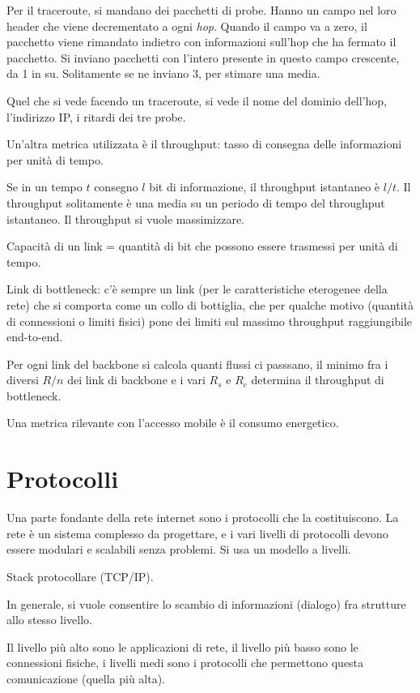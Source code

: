 Per il traceroute, si mandano dei pacchetti di probe. Hanno un campo nel loro header che viene decrementato a ogni \emph{hop}. Quando il campo va a zero, il pacchetto viene rimandato indietro con informazioni sull'hop che ha fermato il pacchetto. Si inviano pacchetti con l'intero presente in questo campo crescente, da 1 in su. Solitamente se ne inviano 3, per stimare una media.

Quel che si vede facendo un traceroute, si vede il nome del dominio dell'hop, l'indirizzo IP, i ritardi dei tre probe.

Un'altra metrica utilizzata \`e il throughput: tasso di consegna delle informazioni per unit\`a di tempo.

Se in un tempo $t$ consegno $l$ bit di informazione, il throughput istantaneo \`e $l/t$. Il throughput solitamente \`e una media su un periodo di tempo del throughput istantaneo. Il throughput si vuole massimizzare.

Capacit\`a di un link = quantit\`a di bit che possono essere trasmessi per unit\`a di tempo.

Link di bottleneck: c'\`e sempre un link (per le caratteristiche eterogenee della rete) che si comporta come un collo di bottiglia, che per qualche motivo (quantit\`a di connessioni o limiti fisici) pone dei limiti sul massimo throughput raggiungibile end-to-end.

Per ogni link del backbone si calcola quanti flussi ci passsano, il minimo fra i diversi $R/n$ dei link di backbone e i vari $R_s$ e $R_c$ determina il throughput di bottleneck.


Una metrica rilevante con l'accesso mobile \`e il consumo energetico.

\section{Protocolli}

Una parte fondante della rete internet sono i protocolli che la costituiscono. La rete \`e un sistema complesso da progettare, e i vari livelli di protocolli devono essere modulari e scalabili senza problemi. Si usa un modello a livelli.

Stack protocollare (TCP/IP).

In generale, si vuole consentire lo scambio di informazioni (dialogo) fra strutture allo stesso livello.

Il livello pi\`u alto sono le applicazioni di rete, il livello pi\`u basso sono le connessioni fisiche, i livelli medi sono i protocolli che permettono questa comunicazione (quella pi\`u alta).

